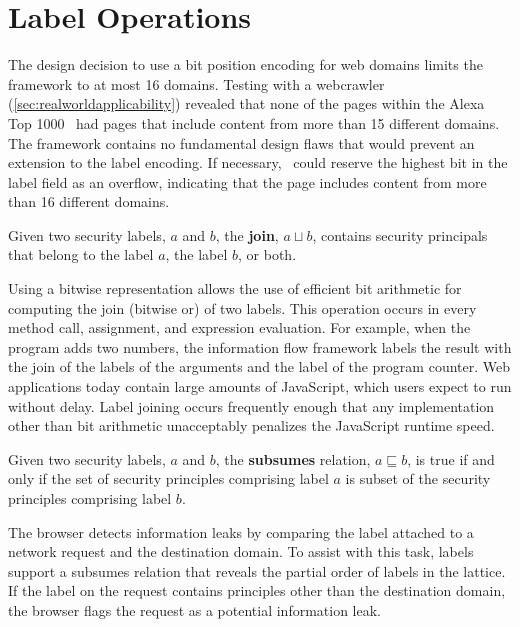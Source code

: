 
\section{Label Operations}

The design decision to use a bit position encoding for web domains limits the framework to at most 16 domains.
Testing with a webcrawler (\autoref{sec:realworldapplicability}) revealed that none of the pages within the Alexa Top 1000~\cite{alexa} had pages that include content from more than 15 different domains.
The framework contains no fundamental design flaws that would prevent an extension to the label encoding.
If necessary, \JitFlow\ could reserve the highest bit in the label field as an overflow, indicating that the page includes content from more than 16 different domains.

\begin{definition}
  Given two security labels, $a$ and $b$, the {\bf join}, $a \sqcup b$, contains security principals that belong to the label $a$, the label $b$, or both.
\end{definition}

Using a bitwise representation allows the use of efficient bit arithmetic for computing the join (bitwise or) of two labels.
This operation occurs in every method call, assignment, and expression evaluation.
For example, when the program adds two numbers, the information flow framework labels the result with the join of the labels of the arguments and the label of the program counter.
Web applications today contain large amounts of JavaScript, which users expect to run without delay.
Label joining occurs frequently enough that any implementation other than bit arithmetic unacceptably penalizes the JavaScript runtime speed.

\begin{definition}
  Given two security labels, $a$ and $b$, the {\bf subsumes} relation, $a \sqsubseteq b$, is true if and only if the set of security principles comprising label $a$ is subset of the security principles comprising label $b$.
\end{definition}

The browser detects information leaks by comparing the label attached to a network request and the destination domain.
To assist with this task, labels support a subsumes relation that reveals the partial order of labels in the lattice.
If the label on the request contains principles other than the destination domain, the browser flags the request as a potential information leak.

